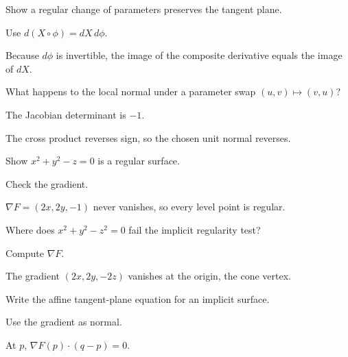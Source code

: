 \begin{exercise}\label{exr:vii14-11}
Show a regular change of parameters preserves the tangent plane.
\end{exercise}
\begin{hint}
Use \(d(X\circ\phi)=dX\,d\phi\).
\end{hint}
\begin{solution}
Because \(d\phi\) is invertible, the image of the composite derivative equals the image of \(dX\).
\end{solution}

\begin{exercise}\label{exr:vii14-12}
What happens to the local normal under a parameter swap \((u,v)\mapsto(v,u)\)?
\end{exercise}
\begin{hint}
The Jacobian determinant is \(-1\).
\end{hint}
\begin{solution}
The cross product reverses sign, so the chosen unit normal reverses.
\end{solution}

\begin{exercise}\label{exr:vii14-13}
Show \(x^2+y^2-z=0\) is a regular surface.
\end{exercise}
\begin{hint}
Check the gradient.
\end{hint}
\begin{solution}
\(\nabla F=(2x,2y,-1)\) never vanishes, so every level point is regular.
\end{solution}

\begin{exercise}\label{exr:vii14-14}
Where does \(x^2+y^2-z^2=0\) fail the implicit regularity test?
\end{exercise}
\begin{hint}
Compute \(\nabla F\).
\end{hint}
\begin{solution}
The gradient \((2x,2y,-2z)\) vanishes at the origin, the cone vertex.
\end{solution}

\begin{exercise}\label{exr:vii14-15}
Write the affine tangent-plane equation for an implicit surface.
\end{exercise}
\begin{hint}
Use the gradient as normal.
\end{hint}
\begin{solution}
At \(p\), \(\nabla F(p)\cdot(q-p)=0\).
\end{solution}

